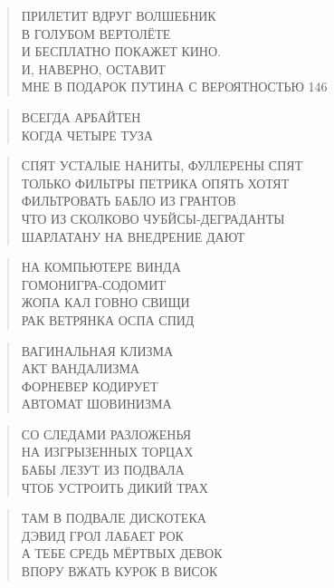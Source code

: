 \poemtitle{***}
\begin{verse}
ПРИЛЕТИТ ВДРУГ ВОЛШЕБНИК\\
В ГОЛУБОМ ВЕРТОЛЁТЕ\\
И БЕСПЛАТНО ПОКАЖЕТ КИНО.\\
И, НАВЕРНО, ОСТАВИТ\\
МНЕ В ПОДАРОК ПУТИНА С ВЕРОЯТНОСТЬЮ 146%
\end{verse}

\poemtitle{***}
\begin{verse}
ВСЕГДА АРБАЙТЕН\\
КОГДА ЧЕТЫРЕ ТУЗА
\end{verse}

\poemtitle{***}
\begin{verse}
СПЯТ УСТАЛЫЕ НАНИТЫ, ФУЛЛЕРЕНЫ СПЯТ\\
ТОЛЬКО ФИЛЬТРЫ ПЕТРИКА ОПЯТЬ ХОТЯТ\\
ФИЛЬТРОВАТЬ БАБЛО ИЗ ГРАНТОВ\\
ЧТО ИЗ СКОЛКОВО ЧУБЙСЫ-ДЕГРАДАНТЫ\\
ШАРЛАТАНУ НА ВНЕДРЕНИЕ ДАЮТ
\end{verse}

\poemtitle{***}
\begin{verse}
НА КОМПЬЮТЕРЕ ВИНДА\\
ГОМОНИГРА-СОДОМИТ\\
ЖОПА КАЛ ГОВНО СВИЩИ\\
РАК ВЕТРЯНКА ОСПА СПИД
\end{verse}

\poemtitle{***}
\begin{verse}
ВАГИНАЛЬНАЯ КЛИЗМА \\
АКТ ВАНДАЛИЗМА\\
ФОРНЕВЕР КОДИРУЕТ\\
АВТОМАТ ШОВИНИЗМА
\end{verse}

\poemtitle{***}
\begin{verse}
СО СЛЕДАМИ РАЗЛОЖЕНЬЯ\\
НА ИЗГРЫЗЕННЫХ ТОРЦАХ\\
БАБЫ ЛЕЗУТ ИЗ ПОДВАЛА\\
ЧТОБ УСТРОИТЬ ДИКИЙ ТРАХ
\end{verse}

\poemtitle{***}
\begin{verse}
ТАМ В ПОДВАЛЕ ДИСКОТЕКА\\
ДЭВИД ГРОЛ ЛАБАЕТ РОК\\
А ТЕБЕ СРЕДЬ МЁРТВЫХ ДЕВОК\\
ВПОРУ ВЖАТЬ КУРОК В ВИСОК
\end{verse}

